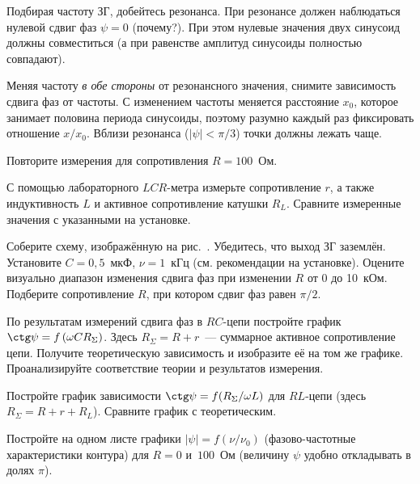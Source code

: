 \begin{lab:task}
\item Подбирая частоту ЗГ, добейтесь резонанса. 
При резонансе должен наблюдаться нулевой сдвиг фаз $\psi=0$ (почему?).
При этом нулевые значения двух 
синусоид должны совместиться (а при равенстве амплитуд синусоиды 
полностью совпадают).
 
\item Меняя частоту \emph{в обе стороны} от резонансного значения, 
снимите зависимость сдвига фаз от частоты. С изменением частоты меняется 
расстояние $x_0$, которое занимает половина периода синусоиды, поэтому 
разумно каждый раз фиксировать отношение $x/x_0$. 
Вблизи резонанса ($|\psi|<\pi/3$) точки должны лежать чаще.
 
\item Повторите измерения для сопротивления $R=100$~Ом.
 
\item С помощью лабораторного $LCR$-метра измерьте сопротивление $r$,
а также индуктивность $L$ и активное сопротивление катушки $R_L$. 
Сравните измеренные значения с указанными на установке.



\item Соберите схему, изображённую на рис.~. Убедитесь, что 
выход ЗГ заземлён. Установите $C=0,5$~мкФ,  $\nu=1$~кГц
(см. рекомендации на установке). Оцените визуально диапазон изменения 
сдвига фаз при изменении $R$ от 0 до 10~кОм.
Подберите сопротивление $R$, при котором сдвиг фаз равен $\pi/2$.



\item По результатам измерений сдвига фаз в $RC$-цепи постройте график
$\ctg\psi=f\left(\omega C R_{\Sigma}\right)$. Здесь $R_{\Sigma}=R+r$~--- 
суммарное активное сопротивление цепи. Получите теоретическую 
зависимость и изобразите её на том же графике. Проанализируйте
соответствие теории и результатов измерения.

\item Постройте график зависимости $\ctg\psi=f(R_{\Sigma}/\omega L)$ 
для $RL$-цепи (здесь $R_{\Sigma}=R+r+R_L$). Сравните график с теоретическим.

\item Постройте на одном листе графики $|\psi|=f(\nu/\nu_0)$ 
(фазово-частотные характеристики контура) для $R=0$ и~$100$~Ом (величину $\psi$ удобно откладывать в долях $\pi$).


\end{lab:task}
